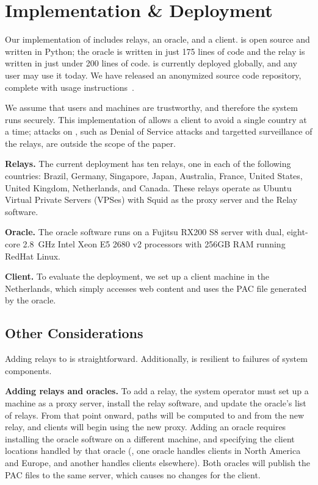\section{Implementation \& Deployment}

Our implementation of \system{} includes relays, an oracle, and 
a client. \system{} is open source and written in Python; the oracle is written in just 
175 lines of code and the relay is written in just under 200 lines of code.  \system{} is currently deployed globally, and
any user may use it today.  We have released an anonymized source code repository,
complete with usage instructions~\cite{ran_system}.

We assume that users and machines are trustworthy, and therefore the system runs 
securely.  This implementation of \system{} allows a client to avoid a single country 
at a time; attacks on \system{}, such as Denial of Service attacks and targetted 
surveillance of the relays, are outside the scope of the paper.

{\bf Relays.}  The current deployment has ten relays, one in each
of the following
countries: Brazil,  Germany, Singapore, Japan, Australia, France, United
States, United Kingdom, Netherlands, and Canada.  These relays operate
as Ubuntu Virtual Private Servers (VPSes) with Squid as the proxy
server and the \system{} Relay software.


{\bf Oracle.}  The oracle software runs on a Fujitsu RX200 S8 server with dual, 
eight-core 2.8~GHz Intel Xeon E5 2680 v2 processors with 256GB RAM running 
RedHat Linux. 

{\bf Client.} To evaluate the \system{} deployment, we set up a client 
machine in the Netherlands, which simply accesses web content and uses the PAC 
file generated by the oracle. 

\subsection{Other Considerations}
Adding relays to \system{} is 
straightforward. Additionally, \system{} is resilient to failures of system components.

{\bf Adding relays and oracles.} To add a relay, the system
operator must set up a machine as a proxy server, install the relay
software, and update the oracle's list of relays.  From that point
onward, paths will be computed to and from the new relay, and clients
will begin using the new proxy.  Adding an oracle requires installing
the oracle software on a different machine, and specifying the client
locations handled by that oracle (\eg, one oracle handles clients in
North America and Europe, and another handles clients elsewhere).
Both oracles will publish the PAC files to the same server, which
causes no changes for the client.


